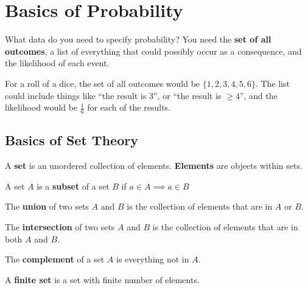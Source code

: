 
\section{Basics of Probability}

What data do you need to specify probability? You need the \textbf{set of all outcomes}, a list of everything that could possibly occur as a consequence, and the likelihood of each event.


\begin{eg}
	For a roll of a dice, the set of all outcomes would be \( \{1,2,3,4,5,6\}   \). The list could include things like ``the result is 3'', or ``the result is \( \ge 4 \)'', and the likelihood would be \( \frac{1}{6} \) for each of the results.
\end{eg}

\subsection{Basics of Set Theory}

\begin{definition}
	A \textbf{set} is an unordered collection of elements. \textbf{Elements} are objects within sets.
\end{definition}

\begin{definition}
	A set \( A \) is a \textbf{subset} of a set \( B \) if \( a \in A \implies a \in B \)
\end{definition}

\begin{definition}
	The \textbf{union} of two sets \( A \) and \( B \) is the collection of elements that are in \( A \) or \( B \).
\end{definition}

\begin{definition}
	The \textbf{intersection} of two sets \( A \) and \( B \) is the collection of elements that are in both \( A \) and \( B \).
\end{definition}

\begin{definition}
	The \textbf{complement} of a set \( A \) is everything not in \( A \).
\end{definition}

\begin{definition}
	A \textbf{finite set} is a set with finite number of elements.
\end{definition}

